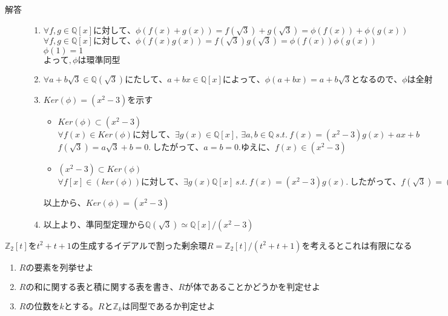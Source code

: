 \documentclass[dvipdfmx]{jsarticle}
\begin{document}
\begin{description}
  \item[解答] \mbox{}
  \begin{enumerate}
    \item $\forall f, g \in \mathbb{Q}[x]に対して、\phi(f(x)+g(x)) = f(\sqrt{3}) + g(\sqrt{3}) = \phi(f(x)) + \phi(g(x))$ \\
    $\forall f,g \in \mathbb{Q}[x]に対して、\phi (f(x)g(x)) = f(\sqrt{3})g(\sqrt{3}) = \phi(f(x))\phi(g(x))$ \\
    $\phi(1) = 1$ \\
    $よって,\phi は環準同型$

    \item $\forall a+b\sqrt{3} \in \mathbb{Q}(\sqrt{3})にたして、a+bx \in \mathbb{Q}[x]によって、\phi(a+bx) = a+b\sqrt{3}となるので、\phi　は全射$

    \item $Ker(\phi) = (x^2-3)を示す$
    \begin{itemize}
      \item $Ker(\phi) \subset (x^2-3)$\\
      $\forall f(x) \in Ker(\phi)に対して、\exists g(x) \in \mathbb{Q}[x], \ \exists a, b \in \mathbb{Q} \ s.t. \ f(x) = (x^2-3)g(x) + ax+b$ \\
      $f(\sqrt{3}) = a\sqrt{3}+b = 0. \ したがって、a=b=0.　ゆえに、f(x) \in (x^2-3)$

      \item $(x^2-3) \subset Ker(\phi)$\\
      $\forall f[x] \in (ker(\phi))に対して、\exists g(x) \mathbb{Q}[x] \ s.t. \ f(x) = (x^2-3)g(x). \ したがって、f(\sqrt{3}) = (3-3)g(x) = 0. \ よって、f(x) \in Ker(\phi)$
    \end{itemize}
    $以上から、Ker(\phi) = (x^2-3)$

    \item $以上より、準同型定理から\mathbb{Q}(\sqrt{3}) \simeq \mathbb{Q}[x]/(x^2-3)$
  \end{enumerate}
\end{description}

\begin{tcolorbox}[colframe=black!50,colback=white,colbacktitle=black!50,coltitle=white,fonttitle=\bfseries\sffamily,title=問題3]
$\mathbb{Z}_2[t]をt^2+t+1の生成するイデアルで割った剰余環R=\mathbb{Z}_2[t]/(t^2+t+1)を考えるとこれは有限になる$
\begin{enumerate}
  \item $Rの要素を列挙せよ$
  \item $Rの和に関する表と積に関する表を書き、Rが体であることかどうかを判定せよ$
  \item $Rの位数をkとする。Rと\mathbb{Z}_kは同型であるか判定せよ$
\end{enumerate}
\end{tcolorbox}
\end{document}
